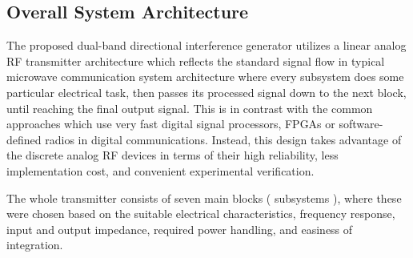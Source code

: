 \documentclass[12pt,a4paper]{report}
\begin{document}
	
	\subsection{Overall System Architecture}
	The proposed dual-band directional interference generator utilizes a linear analog RF transmitter architecture which reflects the standard signal flow in typical microwave communication system architecture where every subsystem does some particular electrical task, then passes its processed signal down to the next block, until reaching the final output signal. This is in contrast with the common approaches which use very fast digital signal processors, FPGAs or software-defined radios in digital communications. Instead, this design takes advantage of the discrete analog RF devices in terms of their high reliability, less implementation cost, and convenient experimental verification. 
	\vspace{0.5cm}
	
	The whole transmitter consists of seven main blocks ( subsystems ), where these were chosen based on the suitable electrical characteristics, frequency response, input and output impedance, required power handling, and easiness of integration. 
	\vspace{0.5cm}
	
\end{document}
